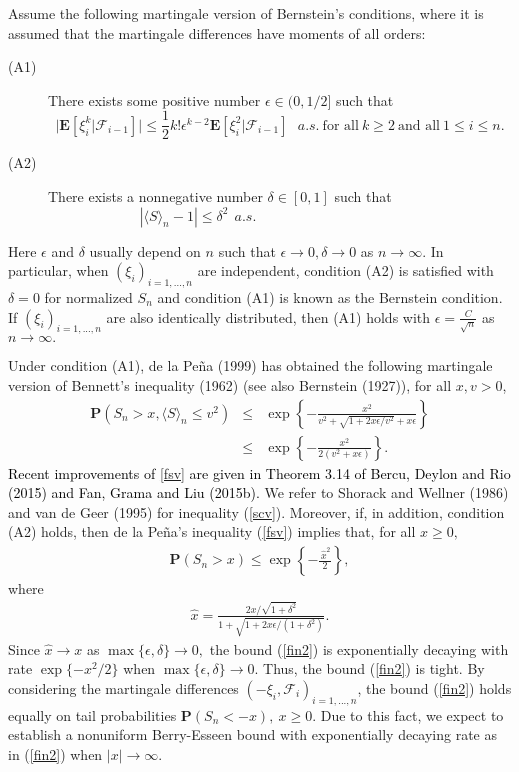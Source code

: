 \documentclass{gSTA2e}
\theoremstyle{plain}
\theoremstyle{definition}
\theoremstyle{remark}
\begin{document}
Assume the following martingale version of Bernstein's conditions,
where it is assumed that the martingale differences have moments of all orders:
\begin{description}
\item[(A1)]  There exists some positive number  $\epsilon \in (0, 1/2]$ such that
\[
\Big|\mathbf{E}[\xi_{i}^{k}  | \mathcal{F}_{i-1}] \Big| \leq \frac12 k!\epsilon^{k-2} \mathbf{E}[\xi_{i}^2 | \mathcal{F}_{i-1}] \ \ \ a.s.  \ \textrm{for all}\ k\geq 2\   \textrm{and all} \ 1\leq i\leq n.
\]
\item[(A2)] There exists a nonnegative  number $\delta \in [0,1]$ such that
\[
 |\langle S\rangle_{n}-1| \leq \delta^2  \ \  a.s. \ \ \  \ \ \ \ \ \ \ \ \ \ \ \ \ \ \ \ \ \ \ \ \ \ \ \ \ \ \ \ \ \ \ \ \ \ \ \ \ \ \ \ \ \ \ \ \ \ \ \ \ \
\]
\end{description}
Here $\epsilon$ and $\delta$ usually depend on $n$ such that $\epsilon  \rightarrow 0, \delta \rightarrow 0$ as $n\rightarrow \infty$.
In particular, when $(\xi _i)_{i=1,...,n}$ are independent, condition (A2) is satisfied with $\delta=0$ for normalized $S_n$ and condition (A1) is known as the Bernstein condition. If $(\xi _i)_{i=1,...,n}$ are also identically distributed, then (A1) holds with  $\epsilon=\frac {C} {\sqrt{n}} $ as $n\rightarrow \infty.$

Under condition (A1), de la Pe\~{n}a (1999) has obtained the following martingale version of Bennett's inequality (1962) (see also Bernstein (1927)),  for all $x,v >0$,
\begin{eqnarray}
\mathbf{P}(S_n> x, \langle S\rangle_{n}\leq v^2 ) &\leq&  \exp\left\{-\frac{x^2}{ v^2+\sqrt{1+2 x\epsilon/v^2   } +  x \epsilon  }\right\}  \label{fsv}  \\
&\leq&  \exp\left\{-\frac{x^2}{ 2( v^2 + x\epsilon ) }\right\}. \label{scv}
\end{eqnarray}
\textcolor{black}{Recent improvements of \eqref{fsv} are given in Theorem 3.14 of Bercu, Deylon and Rio (2015)
and Fan, Grama and Liu (2015b).}
We refer to Shorack and Wellner (1986) and van de Geer (1995) for  inequality (\ref{scv}).
Moreover, if, in addition, condition (A2) holds, then de la Pe\~{n}a's inequality (\ref{fsv}) implies that, for all $x\geq 0,$
\begin{eqnarray}
\mathbf{P}(S_n> x ) \leq \exp\left\{-\frac{\, \widehat{x}^2}{ 2 }\right\}, \label{fin2}
\end{eqnarray}
where
\begin{eqnarray}\label{fbxr000}
\widehat{x}   = \frac{2x/\sqrt{1+\delta^2}}{1+\sqrt{1+2x\epsilon/(1+\delta^2)}}.
\end{eqnarray}
Since $\widehat{x}\rightarrow x$ as $\max\{\epsilon,
\delta\}\rightarrow 0,$ the bound (\ref{fin2}) is exponentially decaying with rate $\exp\{-x^2/2\}$ when $\max\{\epsilon, \delta\}\rightarrow 0$.
Thus, the  bound (\ref{fin2}) is tight.
By considering the martingale differences $(-\xi_{i}, \mathcal{F}_{i})_{i=1,...,n}$,  the bound (\ref{fin2}) holds equally on tail probabilities
$\mathbf{P}(S_n< - x),\ x\geq 0.$
Due to this fact, we expect to establish a nonuniform Berry-Esseen bound with exponentially decaying rate as in (\ref{fin2}) when $|x|\rightarrow \infty$.
\end{document}
